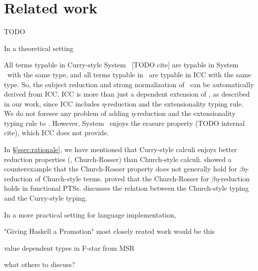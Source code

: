 \section{Related work}
\label{sec:relwork}
TODO

In a theoretical setting

All terms typable in Curry-style System \Fw\ [TODO cite] are typable
in System \Fi\ with the same type, and all terms typable in \Fi\ are
typable in ICC \cite{Miquel01} with the same type. So, the subject reduction
and strong normalization of \Fi\ can be automatically derived from ICC.
ICC is more than just a dependent extension of \Fi, as described in our work,
since ICC includes $\eta$-reduction and the extensionality typing rule.
We do not foresee any problem of adding $\eta$-reduction and
the extensionality typing rule to \Fi. However, System \Fi\ enjoys
the erasure property (TODO internal cite), which ICC does not provide.

In \S\ref{ssec:rationale}, we have mentioned that Curry-style calculi enjoys
better reduction properties (\ie, Church-Rosser) than Church-style calculi. 
\citet{Nederpelt73} showed a counterexample that the Church-Rosser property
does not generally hold for $\beta\eta$-reduction of Church-style terms.
\citet{Geuvers92} proved that the Church-Rosser for $\beta\eta$-reduction
holds in functional PTSs. \citet{Seldin08} discusses the relation between
the Church-style typing and the Curry-style typing.

In a more practical setting for language implementation,

\citet{YorgeyWCJVM12}
"Giving Haskell a Promotion" 
most closely reated work would be this

\citet{Swamy11}
value dependent types in F-star  from MSR


what others to discuss?

